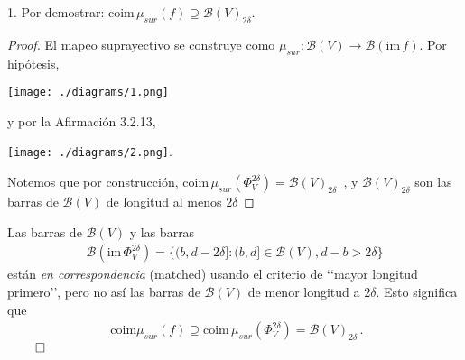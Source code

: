 \documentclass{beamer}
\begin{document}
\begin{frame}{1. Por demostrar: $\mbox{coim} \, \mu_{sur}(f)\supseteq \mathcal{B}(V)_{2\delta}$.}
\begin{proof}\renewcommand{\qedsymbol}{}
El mapeo suprayectivo se construye como $\mu_{sur}: \mathcal{B}(V ) \rightarrow \mathcal{B}(\mbox{im}\, f )$. Por hip\'otesis,
 \begin{center}
 \texttt{[image: ./diagrams/1.png]}
 \end{center}
 y por la Afirmaci\'on 3.2.13,
  \begin{center}
 \texttt{[image: ./diagrams/2.png]}.
 \end{center}
Notemos que por construcci\'on, $\mbox{coim}\,\mu_{sur}(\Phi_{V}^{2\delta})=\mathcal{B}(V)_{2\delta}$
$\,$, y $\mathcal{B}(V)_{2\delta}$ son las barras de $\mathcal{B}(V)$ de longitud al menos $2\delta$
\end{proof}
\end{frame}


\begin{frame}
Las barras de $\mathcal{B}(V)$ y las barras
\begin{gather*}
\mathcal{B}(\mbox{im}\, \Phi_{V}^{2\delta})=\{ (b, d -2\delta] :
(b, d] \in \mathcal{B}(V ), d - b > 2\delta\}
\end{gather*}
\vspace{0.5em}
 est\'an \emph{en correspondencia} (matched) usando el criterio de \lq\lq mayor longitud primero\rq\rq, pero no as\'i las barras de $\mathcal{B}(V)$ de menor longitud a $2\delta$. Esto significa que 
 \begin{gather*}
\mbox{ coim}\mu_{sur}(f)\supseteq \mbox{coim}\,\mu_{sur} (\Phi^{2\delta}_{V} )=\mathcal{B}(V)_{2\delta}\,.
 \end{gather*}
 $\,\hfill \qed$
\end{frame}
\end{document}
